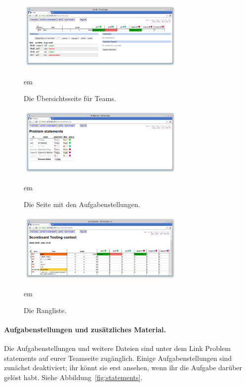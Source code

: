\begin{figure}[t]
\begin{center}
\includegraphics[width=0.73\textwidth]{overview.png}
\end{center}
 em
\caption{Die Übersichtsseite für Teams.}
\label{fig:overview}

\begin{center}
\includegraphics[width=0.73\textwidth]{statements.png}
\end{center}
 em
\caption{Die Seite mit den Aufgabenstellungen.}
\label{fig:statements}

\begin{center}
\includegraphics[width=0.73\textwidth]{ranking.png}
\end{center}
 em
\caption{Die Rangliste.}
\label{fig:ranking}
\end{figure}

\paragraph{Aufgabenstellungen und zusätzliches Material.}
Die Aufgabenstellungen und weitere Dateien sind unter dem Link \glqq Problem
statements\grqq{} auf eurer Teamseite zugänglich. Einige Aufgabenstellungen sind
zunächst deaktiviert; ihr könnt sie erst ansehen, wenn ihr die Aufgabe darüber
gelöst habt.
Siehe Abbildung~\ref{fig:statements}.

